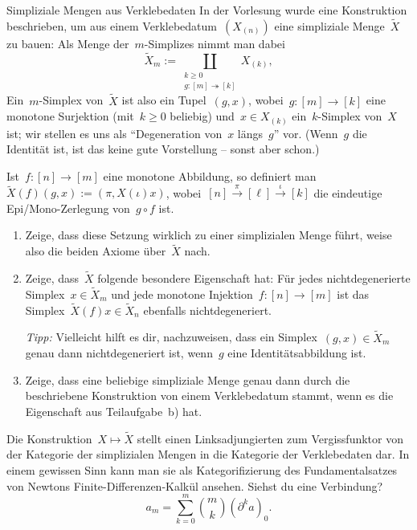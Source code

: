 \documentclass{uebblatt}
\begin{document}
\begin{aufgabe}{Simpliziale Mengen aus Verklebedaten}
In der Vorlesung wurde eine Konstruktion beschrieben, um aus einem
Verklebedatum~$(X_{(n)})$ eine simpliziale Menge~$\widetilde X$ zu bauen: Als
Menge der~$m$-Simplizes nimmt man dabei
\[ \widetilde X_m := \coprod_{\substack{k \geq 0 \\ g : [m] \twoheadrightarrow [k]}} X_{(k)}, \]
Ein~$m$-Simplex von~$\widetilde X$ ist also ein Tupel~$(g,x)$, wobei~$g : [m]
\to [k]$ eine monotone Surjektion (mit~$k \geq 0$ beliebig) und~$x \in X_{(k)}$
ein~$k$-Simplex von~$X$ ist; wir stellen es uns als "`Degeneration von~$x$
längs~$g$"' vor. (Wenn~$g$ die Identität ist, ist das keine gute Vorstellung --
sonst aber schon.)

Ist~$f : [n] \to [m]$ eine monotone Abbildung, so definiert
man~$\widetilde X(f)(g,x) := (\pi, X(\iota)x)$, wobei~$[n]
\xrightarrow{\pi} [\ell] \xrightarrow{\iota} [k]$ die eindeutige Epi/Mono-Zerlegung
von~$g \circ f$ ist.
\begin{enumerate}
\item Zeige, dass diese Setzung wirklich zu einer simplizialen Menge führt,
weise also die beiden Axiome über~$\widetilde X$ nach.
\item Zeige, dass~$\widetilde X$ folgende besondere Eigenschaft hat: Für jedes
nichtdegenerierte Simplex~$x \in \widetilde X_m$ und jede monotone Injektion~$f
: [n] \to [m]$ ist das Simplex~$\widetilde X(f)x \in \widetilde X_n$
ebenfalls nichtdegeneriert.

\emph{Tipp:} Vielleicht hilft es dir, nachzuweisen, dass ein Simplex~$(g,x) \in
\widetilde X_m$ genau dann nichtdegeneriert ist, wenn~$g$ eine
Identitätsabbildung ist.

\item Zeige, dass eine beliebige simpliziale Menge genau dann durch die
beschriebene Konstruktion von einem Verklebedatum stammt, wenn es die
Eigenschaft aus Teilaufgabe~b) hat.
\end{enumerate}

Die Konstruktion~$X \mapsto \widetilde X$ stellt einen Linksadjungierten zum
Vergissfunktor von der Kategorie der simplizialen Mengen in die Kategorie der
Verklebedaten dar. In einem gewissen Sinn kann man sie als Kategorifizierung
des Fundamentalsatzes von Newtons Finite-Differenzen-Kalkül ansehen.
Siehst du eine Verbindung?
\[ a_m = \sum_{k=0}^m \binom{m}{k} (\partial^k a)_0. \]
\end{aufgabe}

\vspace{-\aufgabenskip}
\end{document}
